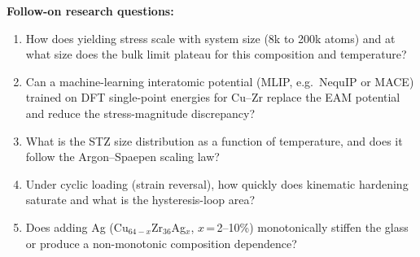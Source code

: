 \documentclass[11pt]{article}
\begin{document}
\noindent\textbf{Follow-on research questions:}
\begin{enumerate}[leftmargin=1.6em,itemsep=0.2em,topsep=0.2em,label=Q\arabic*.]
\item How does yielding stress scale with system size (8k to 200k atoms) and at what size does the bulk limit plateau for this composition and temperature?
\item Can a machine-learning interatomic potential (MLIP, e.g.\ NequIP or MACE) trained on DFT single-point energies for Cu--Zr replace the EAM potential and reduce the stress-magnitude discrepancy?
\item What is the STZ size distribution as a function of temperature, and does it follow the Argon--Spaepen scaling law?
\item Under cyclic loading (strain reversal), how quickly does kinematic hardening saturate and what is the hysteresis-loop area?
\item Does adding Ag (Cu$_{64-x}$Zr$_{36}$Ag$_x$, $x$\,=\,2--10\%) monotonically stiffen the glass or produce a non-monotonic composition dependence?
\end{enumerate}
\end{document}
